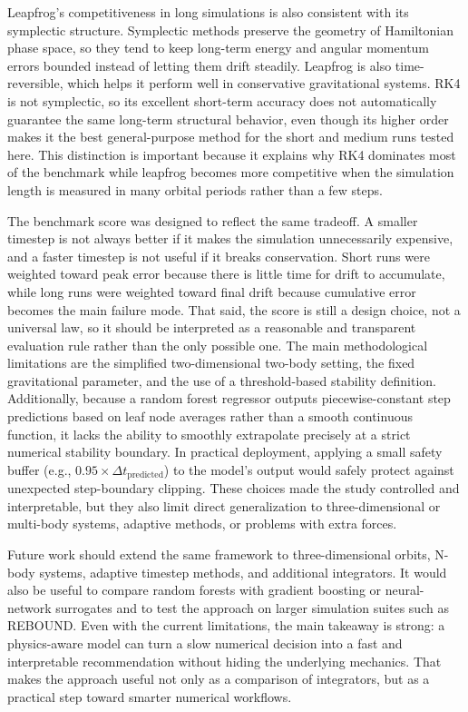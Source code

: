 \documentclass[12pt]{article}
\begin{document}
Leapfrog's competitiveness in long simulations is also consistent with its symplectic structure. Symplectic methods preserve the geometry of Hamiltonian phase space, so they tend to keep long-term energy and angular momentum errors bounded instead of letting them drift steadily. Leapfrog is also time-reversible, which helps it perform well in conservative gravitational systems. RK4 is not symplectic, so its excellent short-term accuracy does not automatically guarantee the same long-term structural behavior, even though its higher order makes it the best general-purpose method for the short and medium runs tested here. This distinction is important because it explains why RK4 dominates most of the benchmark while leapfrog becomes more competitive when the simulation length is measured in many orbital periods rather than a few steps.

The benchmark score was designed to reflect the same tradeoff. A smaller timestep is not always better if it makes the simulation unnecessarily expensive, and a faster timestep is not useful if it breaks conservation. Short runs were weighted toward peak error because there is little time for drift to accumulate, while long runs were weighted toward final drift because cumulative error becomes the main failure mode. That said, the score is still a design choice, not a universal law, so it should be interpreted as a reasonable and transparent evaluation rule rather than the only possible one. The main methodological limitations are the simplified two-dimensional two-body setting, the fixed gravitational parameter, and the use of a threshold-based stability definition. Additionally, because a random forest regressor outputs piecewise-constant step predictions based on leaf node averages rather than a smooth continuous function, it lacks the ability to smoothly extrapolate precisely at a strict numerical stability boundary. In practical deployment, applying a small safety buffer (e.g., $0.95 \times \Delta t_{\text{predicted}}$) to the model's output would safely protect against unexpected step-boundary clipping. These choices made the study controlled and interpretable, but they also limit direct generalization to three-dimensional or multi-body systems, adaptive methods, or problems with extra forces.

Future work should extend the same framework to three-dimensional orbits, N-body systems, adaptive timestep methods, and additional integrators. It would also be useful to compare random forests with gradient boosting or neural-network surrogates and to test the approach on larger simulation suites such as REBOUND. Even with the current limitations, the main takeaway is strong: a physics-aware model can turn a slow numerical decision into a fast and interpretable recommendation without hiding the underlying mechanics. That makes the approach useful not only as a comparison of integrators, but as a practical step toward smarter numerical workflows.
\end{document}
